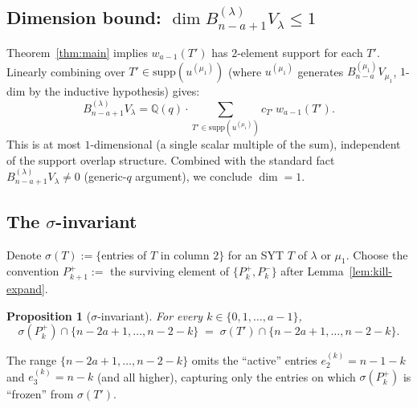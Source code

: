 \documentclass[11pt]{article}
\newtheorem{proposition}[theorem]{Proposition}
\theoremstyle{definition}
\begin{document}
\subsection{Dimension bound: $\dim B_{n-a+1}^{(\lambda)}V_\lambda\le 1$}

Theorem~\ref{thm:main} implies $w_{a-1}(T')$ has $2$-element support
for each $T'$.  Linearly combining over $T'\in\mathrm{supp}(u^{(\mu_1)})$
(where $u^{(\mu_1)}$ generates $B_{n-a}^{(\mu_1)}V_{\mu_1}$, $1$-dim
by the inductive hypothesis) gives:
\[
   B_{n-a+1}^{(\lambda)}V_\lambda
   =\mathbb{Q}(q)\cdot\sum_{T'\in\mathrm{supp}(u^{(\mu_1)})}
     c_{T'}\,w_{a-1}(T').
\]
This is at most $1$-dimensional (a single scalar multiple of the
sum), independent of the support overlap structure.  Combined with
the standard fact $B_{n-a+1}^{(\lambda)}V_\lambda\ne 0$
(generic-$q$ argument), we conclude $\dim=1$.

\subsection{The $\sigma$-invariant}\label{sec:sigma}

Denote $\sigma(T):=\{$entries of $T$ in column $2\}$ for an SYT $T$
of $\lambda$ or $\mu_1$.  Choose the convention $P_{k+1}^+:=$ the
surviving element of $\{P_k^+,P_k^-\}$ after Lemma~\ref{lem:kill-expand}.

\begin{proposition}[$\sigma$-invariant]\label{prop:sigma}
For every $k\in\{0,1,\ldots,a-1\}$,
\begin{equation}\label{eq:sigma-inv}
   \sigma(P_k^+)\cap\{n-2a+1,\ldots,n-2-k\}
   \;=\;
   \sigma(T')\cap\{n-2a+1,\ldots,n-2-k\}.
\end{equation}
\end{proposition}

The range $\{n-2a+1,\ldots,n-2-k\}$ omits the ``active'' entries
$e_2^{(k)}=n-1-k$ and $e_3^{(k)}=n-k$ (and all higher), capturing
only the entries on which $\sigma(P_k^+)$ is ``frozen'' from
$\sigma(T')$.
\end{document}
